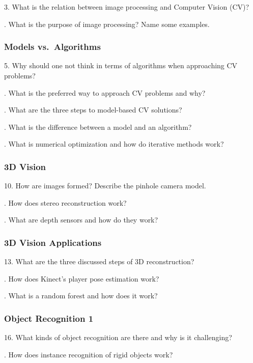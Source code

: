 \documentclass[paper=A4,11pt]{scrartcl}
\begin{document}
3. What is the relation between image processing and Computer Vision (CV)?

\bigskip{}. What is the purpose of image processing? Name some examples.


\subsubsection*{Models vs.\ Algorithms} %

5. Why should one not think in terms of algorithms when approaching CV problems?

\bigskip{}. What is the preferred way to approach CV problems and why?

\bigskip{}. What are the three steps to model-based CV solutions?

\bigskip{}. What is the difference between a model and an algorithm?

\bigskip{}. What is numerical optimization and how do iterative methods work?


\subsubsection*{3D Vision} %

10. How are images formed? Describe the pinhole camera model.

\bigskip{}. How does stereo reconstruction work?

\bigskip{}. What are depth sensors and how do they work?


\subsubsection*{3D Vision Applications} %

13. What are the three discussed steps of 3D reconstruction?

\bigskip{}. How does Kinect's player pose estimation work?

\bigskip{}. What is a random forest and how does it work?


\subsubsection*{Object Recognition 1} %

16. What kinds of object recognition are there and why is it challenging?

\bigskip{}. How does instance recognition of rigid objects work?
\end{document}
